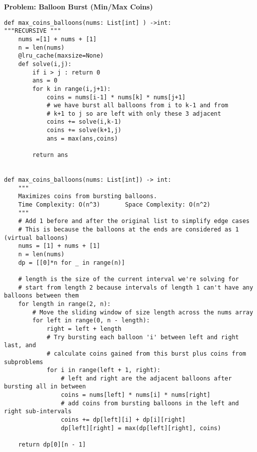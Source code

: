 \noindent\textbf{Problem: Balloon Burst (Min/Max Coins)}
\begin{verbatim}
def max_coins_balloons(nums: List[int] ) ->int:
"""RECURSIVE """
    nums =[1] + nums + [1]
    n = len(nums)
    @lru_cache(maxsize=None)
    def solve(i,j):
        if i > j : return 0
        ans = 0
        for k in range(i,j+1):
            coins = nums[i-1] * nums[k] * nums[j+1]
            # we have burst all balloons from i to k-1 and from
            # k+1 to j so are left with only these 3 adjacent
            coins += solve(i,k-1)
            coins += solve(k+1,j)
            ans = max(ans,coins)

        return ans


def max_coins_balloons(nums: List[int]) -> int:
    """
    Maximizes coins from bursting balloons.
    Time Complexity: O(n^3)       Space Complexity: O(n^2)
    """
    # Add 1 before and after the original list to simplify edge cases
    # This is because the balloons at the ends are considered as 1 (virtual balloons)
    nums = [1] + nums + [1]
    n = len(nums)
    dp = [[0]*n for _ in range(n)]
    
    # length is the size of the current interval we're solving for
    # start from length 2 because intervals of length 1 can't have any balloons between them
    for length in range(2, n):
        # Move the sliding window of size length across the nums array
        for left in range(0, n - length):
            right = left + length              
            # Try bursting each balloon 'i' between left and right last, and
            # calculate coins gained from this burst plus coins from subproblems
            for i in range(left + 1, right):
                # left and right are the adjacent balloons after bursting all in between
                coins = nums[left] * nums[i] * nums[right]
                # add coins from bursting balloons in the left and right sub-intervals
                coins += dp[left][i] + dp[i][right]
                dp[left][right] = max(dp[left][right], coins)
    
    return dp[0][n - 1]

\end{verbatim}

